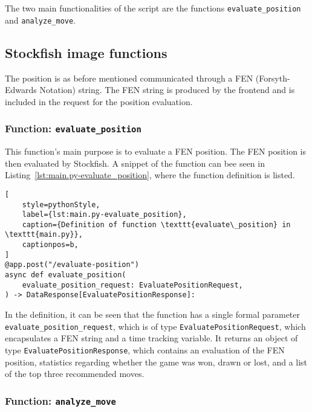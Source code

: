 The two main functionalities of the script are the functions \texttt{evaluate\_position} and \texttt{analyze\_move}.

\subsection{Stockfish image functions}\label{subsec:stockfish-image-functions}

The position is as before mentioned communicated through a FEN (Forsyth-Edwards Notation) string.
The FEN string is produced by the frontend and is included in the request for the position evaluation.

\subsubsection{Function: \texttt{evaluate\_position}}\label{subsubsec:function:evaluate_position}

This function's main purpose is to evaluate a FEN position.
The FEN position is then evaluated by Stockfish.
A snippet of the function can bee seen in Listing~\ref{lst:main.py-evaluate_position}, where the function definition is
listed.

\begin{lstlisting}[
    style=pythonStyle,
    label={lst:main.py-evaluate_position},
    caption={Definition of function \texttt{evaluate\_position} in \texttt{main.py}},
    captionpos=b,
]
@app.post("/evaluate-position")
async def evaluate_position(
    evaluate_position_request: EvaluatePositionRequest,
) -> DataResponse[EvaluatePositionResponse]:
\end{lstlisting}

In the definition, it can be seen that the function has a single formal parameter \texttt{evaluate\_position\_request},
which is of type \texttt{EvaluatePositionRequest}, which encapsulates a FEN string and a time tracking variable.
It returns an object of type \texttt{EvaluatePositionResponse}, which contains an evaluation of the FEN position,
statistics regarding whether the game was won, drawn or lost, and a list of the top three recommended moves.

\subsubsection{Function: \texttt{analyze\_move}}\label{subsubsec:function:analyze_move}

